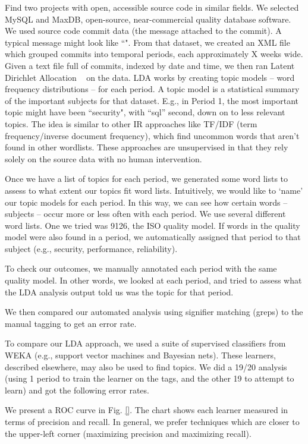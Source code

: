\documentclass[10pt, conference, compsocconf]{IEEEtran}
\begin{document}
Find two projects with open, accessible source code in similar fields. We selected MySQL and MaxDB, open-source, near-commercial quality database software. We used source code commit data (the message attached to the commit). A typical message might look like ``". From that dataset, we created an XML file which grouped commits into temporal periods, each approximately X weeks wide. Given a text file full of commits, indexed by date and time, we then ran Latent Dirichlet Allocation ~\cite{Blei2003} on the data. LDA works by creating topic models -- word frequency distributions -- for each period. A topic model is a statistical summary of the important subjects for that dataset. E.g., in Period 1, the most important topic might have been ``security", with ``sql'' second, down on to less relevant topics. The idea is similar to other IR approaches like TF/IDF (term frequency/inverse document frequency), which find uncommon words that aren't found in other wordlists. These approaches are unsupervised in that they rely solely on the source data with no human intervention.

Once we have a list of topics for each period, we generated some word lists to assess to what extent our topics fit word lists. Intuitively, we would like to `name' our topic models for each period. In this way, we can see how certain words -- subjects -- occur more or less often with each period. We use several different word lists. One we tried was 9126, the ISO quality model. If words in the quality model were also found in a period, we automatically assigned that period to that subject (e.g., security, performance, reliability). 

To check our outcomes, we manually annotated each period with the same quality model. In other words, we looked at each period, and tried to assess what the LDA analysis output told us was the topic for that period.

We then compared our automated analysis using signifier matching (greps) to the manual tagging to get an error rate.

To compare our LDA approach, we used a suite of supervised classifiers from WEKA (e.g., support vector machines and Bayesian nets). These learners, described elsewhere, may also be used to find topics. We did a 19/20 analysis (using 1 period to train the learner on the tags, and the other 19 to attempt to learn) and got the following error rates. 

We present a ROC curve in Fig. \ref{}. The chart shows each learner measured in terms of precision and recall. In general, we prefer techniques which are closer to the upper-left corner (maximizing precision and maximizing recall). 
\end{document}

